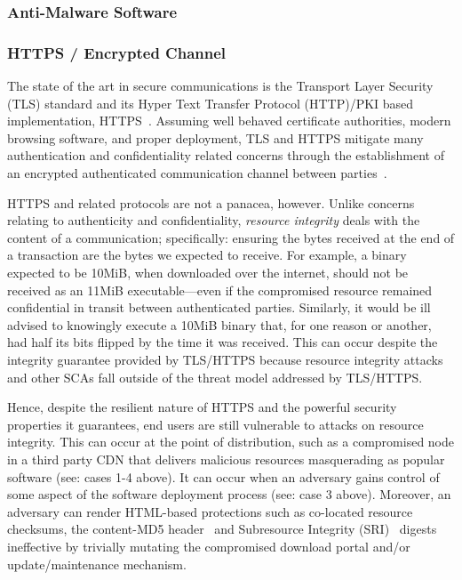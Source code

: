 \subsubsection{Anti-Malware Software}


\subsubsection{HTTPS / Encrypted Channel}

The state of the art in secure communications is the Transport Layer Security
(TLS) standard and its Hyper Text Transfer Protocol (HTTP)/PKI based
implementation, HTTPS~\cite{TLS1.2, HTTPS, PKI}. Assuming well behaved
certificate authorities, modern browsing software, and proper deployment, TLS
and HTTPS mitigate many authentication and confidentiality related concerns
through the establishment of an encrypted authenticated communication channel
between parties~\cite{HTTPS, TLS1.2, DTLS}.

HTTPS and related protocols are not a panacea, however. Unlike concerns relating
to authenticity and confidentiality, \textit{resource integrity} deals with the
content of a communication; specifically: ensuring the bytes received at the end
of a transaction are the bytes we expected to receive. For example, a binary
expected to be 10MiB, when downloaded over the internet, should not be received
as an 11MiB executable---even if the compromised resource remained confidential
in transit between authenticated parties. Similarly, it would be ill advised to
knowingly execute a 10MiB binary that, for one reason or another, had half its
bits flipped by the time it was received. This can occur despite the integrity
guarantee provided by TLS/HTTPS because resource integrity attacks and other
SCAs fall outside of the threat model addressed by TLS/HTTPS.

Hence, despite the resilient nature of HTTPS and the powerful security
properties it guarantees, end users are still vulnerable to attacks on resource
integrity. This can occur at the point of distribution, such as a compromised
node in a third party CDN that delivers malicious resources masquerading as
popular software (see: cases 1-4 above). It can occur when an adversary gains
control of some aspect of the software deployment process (see: case 3 above).
Moreover, an adversary can render HTML-based protections such as co-located
resource checksums, the content-MD5 header~\cite{MD5Header} and Subresource
Integrity (SRI)~\cite{SRI} digests ineffective by trivially mutating the
compromised download portal and/or update/maintenance mechanism.

